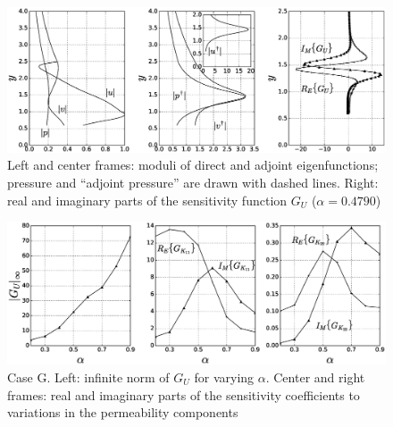 \begin{figure}[H]
	\centering
	\includegraphics[width=1\linewidth]{chapter_3/figure/7}
	\caption{Left and center frames: moduli of direct and adjoint eigenfunctions; pressure and “adjoint pressure” are drawn with
		dashed lines. Right: real and imaginary parts of the sensitivity function $G_U$ ($\alpha = 0.4790$)}
	\label{fig:7}
\end{figure}

\begin{figure}[H]
	\centering
	\includegraphics[width=1\linewidth]{chapter_3/figure/8}
	\caption{Case G. Left: infinite norm of $G_U$ for varying $\alpha$. Center and right frames: real and imaginary parts of the sensitivity
		coefficients to variations in the permeability components}
	\label{fig:8}
\end{figure}

